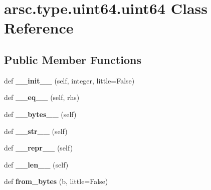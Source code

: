 \hypertarget{classarsc_1_1type_1_1uint64_1_1uint64}{}\section{arsc.\+type.\+uint64.\+uint64 Class Reference}
\label{classarsc_1_1type_1_1uint64_1_1uint64}
\subsection*{Public Member Functions}
\begin{DoxyCompactItemize}
\item 
\mbox{\label{classarsc_1_1type_1_1uint64_1_1uint64_afa0f33ee606b2ba57d7da2f975e85918}} 
def {\bfseries \+\_\+\+\_\+init\+\_\+\+\_\+} (self, integer, little=False)
\item 
\mbox{\label{classarsc_1_1type_1_1uint64_1_1uint64_aa8a8f89146f39612ab54246c5693ee14}} 
def {\bfseries \+\_\+\+\_\+eq\+\_\+\+\_\+} (self, rhs)
\item 
\mbox{\label{classarsc_1_1type_1_1uint64_1_1uint64_a4e593efd8245d2c3e068b3ae630af226}} 
def {\bfseries \+\_\+\+\_\+bytes\+\_\+\+\_\+} (self)
\item 
\mbox{\label{classarsc_1_1type_1_1uint64_1_1uint64_a5f63411371592365a4a5a70dd662d449}} 
def {\bfseries \+\_\+\+\_\+str\+\_\+\+\_\+} (self)
\item 
\mbox{\label{classarsc_1_1type_1_1uint64_1_1uint64_a3931b52c4fb11df74e97069ad91ae913}} 
def {\bfseries \+\_\+\+\_\+repr\+\_\+\+\_\+} (self)
\item 
\mbox{\label{classarsc_1_1type_1_1uint64_1_1uint64_a92bb9d86545c42c7e410f44228274e92}} 
def {\bfseries \+\_\+\+\_\+len\+\_\+\+\_\+} (self)
\item 
\mbox{\label{classarsc_1_1type_1_1uint64_1_1uint64_a1b9a361a6f22aacffd986fadcedbe9a7}} 
def {\bfseries from\+\_\+bytes} (b, little=False)
\end{DoxyCompactItemize}
